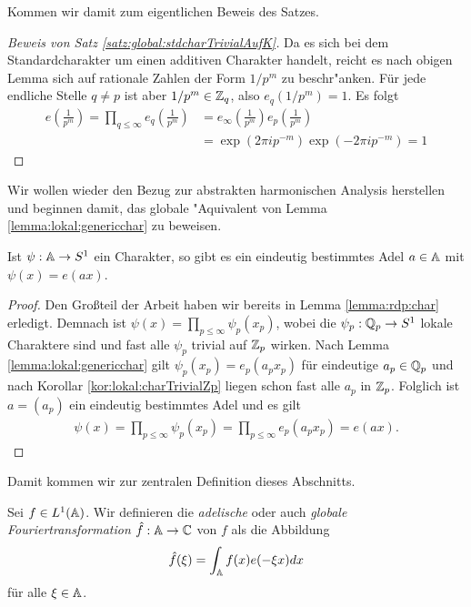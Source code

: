 	Kommen wir damit zum eigentlichen Beweis des Satzes.
	\begin{proof}
		[Beweis von Satz \ref{satz:global:stdcharTrivialAufK}] 
		Da es sich bei dem Standardcharakter um einen additiven Charakter handelt, reicht es nach obigen Lemma sich auf rationale Zahlen der Form $1/p^m$ zu beschr"anken.
		Für jede endliche Stelle $q\not=p$ ist aber $1/p^m \in \mathbb{Z}_q$, also $e_q(1/p^m) =1$.
		Es folgt
		\begin{align*}
			e\left( \frac{1}{p^m} \right) 	= \prod_{q\leq \infty} e_q\left( \frac{1}{p^m} \right) 
											&= e_\infty \left( \frac{1}{p^m} \right) e_p\left( \frac{1}{p^m} \right)\\
											&= \exp(2\pi i p^{-m}) \exp(-2\pi i p^{-m}) = 1
		\end{align*}
	\end{proof}
	Wir wollen wieder den Bezug zur abstrakten harmonischen Analysis herstellen und beginnen damit, das globale "Aquivalent von Lemma \ref{lemma:lokal:genericchar} zu beweisen.
	\begin{lemma}
		Ist $\psi: \mathbb{A} \to S^1$ ein Charakter, so gibt es ein eindeutig bestimmtes Adel $a\in\mathbb{A}$ mit $\psi(x) = e(ax)$.
	\end{lemma}
	\begin{proof}
		Den Großteil der Arbeit haben wir bereits in Lemma \ref{lemma:rdp:char} erledigt. 
		Demnach ist $\psi(x) = \prod_{p\leq\infty} \psi_p (x_p)$, wobei die $\psi_p: {\mathbb{Q}_p} \to S^1$ lokale Charaktere sind und fast alle $\psi_p$ trivial auf ${\mathbb{Z}_p}$ wirken.
		Nach Lemma \ref{lemma:lokal:genericchar} gilt $\psi_p (x_p) = e_p(a_p x_p)$ für eindeutige $a_p \in {\mathbb{Q}_p}$ und nach Korollar \ref{kor:lokal:charTrivialZp} liegen schon fast alle $a_p$ in ${\mathbb{Z}_p}$.
		Folglich ist $a = (a_p)$ ein eindeutig bestimmtes Adel und es gilt
		\begin{align*}
			\psi(x) = \prod_{p\leq\infty} \psi_p (x_p) = \prod_{p\leq\infty} e_p (a_px_p) = e(ax).
		\end{align*}
	\end{proof}
	Damit kommen wir zur zentralen Definition dieses Abschnitts.
	\begin{defi}
		Sei $f\in L^1(\mathbb{A})$. 
		Wir definieren die \emph{adelische} oder auch \emph{globale Fouriertransformation} $\hat{f}: \mathbb{A} \to \mathbb{C}$ von $f$ als die Abbildung
		\begin{align*}
			\hat{f}(\xi) = \int_{\mathbb{A}} f(x)e(-\xi x) d{x}
		\end{align*}
		für alle $\xi \in \mathbb{A}$.
	\end{defi}
	
